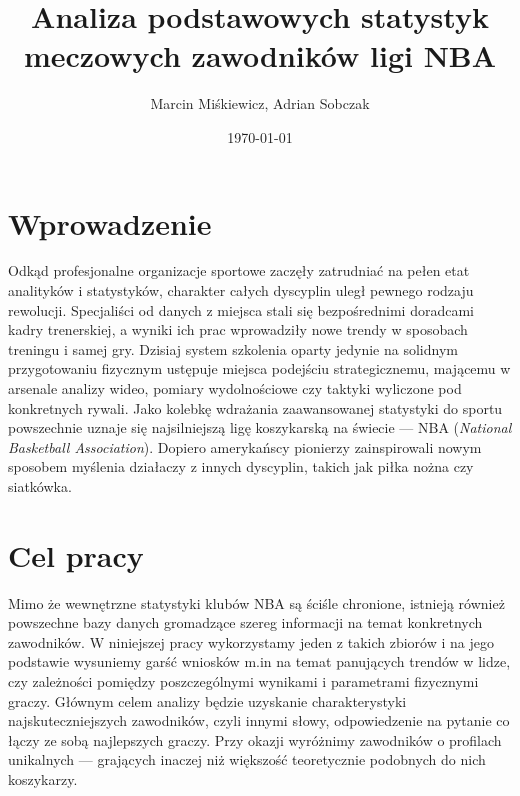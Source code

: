 \documentclass[12pt,a4paper]{article}\usepackage[]{graphicx}\usepackage[]{color}
\author{Marcin Miśkiewicz, Adrian Sobczak}
\title{\textbf{Analiza podstawowych statystyk meczowych zawodników ligi NBA}}
\date{\today}
\begin{document}
\maketitle
\section{Wprowadzenie}

Odkąd profesjonalne organizacje sportowe zaczęły zatrudniać na pełen etat analityków i statystyków, charakter całych dyscyplin uległ pewnego rodzaju rewolucji. Specjaliści od danych z miejsca stali się bezpośrednimi doradcami kadry trenerskiej, a wyniki ich prac wprowadziły nowe trendy w sposobach treningu i samej gry. Dzisiaj system szkolenia oparty jedynie na solidnym przygotowaniu fizycznym ustępuje miejsca podejściu strategicznemu, mającemu w arsenale analizy wideo, pomiary wydolnościowe czy taktyki wyliczone pod konkretnych rywali. Jako kolebkę wdrażania zaawansowanej statystyki do sportu powszechnie uznaje się najsilniejszą ligę koszykarską na świecie --- NBA (\emph{National Basketball Association}). Dopiero amerykańscy pionierzy zainspirowali nowym sposobem myślenia działaczy z innych dyscyplin, takich jak piłka nożna czy siatkówka.

\section{Cel pracy}

Mimo że wewnętrzne statystyki klubów NBA są ściśle chronione, istnieją również powszechne bazy danych gromadzące szereg informacji na temat konkretnych zawodników. W niniejszej pracy wykorzystamy jeden z takich zbiorów i na jego podstawie wysuniemy garść wniosków m.in na temat panujących trendów w lidze, czy zależności pomiędzy poszczególnymi wynikami i parametrami fizycznymi graczy. Głównym celem analizy będzie uzyskanie charakterystyki najskuteczniejszych zawodników, czyli innymi słowy, odpowiedzenie na pytanie co łączy ze sobą najlepszych graczy. Przy okazji wyróżnimy zawodników o profilach unikalnych --- grających inaczej niż większość teoretycznie podobnych do nich koszykarzy.
\end{document}
